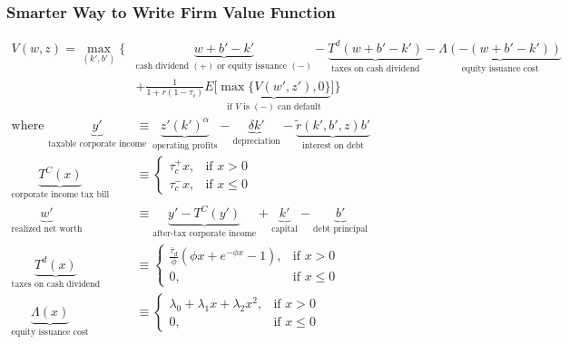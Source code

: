 \documentclass[usenames,dvipsnames, handout]{beamer}
\begin{document}
\begin{frame}
\frametitle{Smarter Way to Write Firm Value Function}
\scriptsize
\begin{align*}
V(w, z) =
\max_{(k', b')} \Bigg\{ 
& \underbrace{w + b' - k'}_{\text{cash dividend } (+) \text{ or equity issuance } (-)} - \underbrace{T^d(w + b' - k')}_{\text{taxes on cash dividend}} - \underbrace{\Lambda(-(w + b' - k'))}_{\text{equity issuance cost}} \\
&+ \frac{1}{1+r(1-\tau_i)} E\Big[\underbrace{\max\{ V(w', z'), 0\}}_{\text{if }V \text{ is } (-) \text{ can default}}\Big] \Bigg\} \\
\text{where }
\underbrace{y'}_{\text{taxable corporate income}} &\equiv \underbrace{z' (k')^\alpha}_{\text{operating profits}} - \underbrace{\delta k'}_{\text{depreciation}} - \underbrace{\tilde r(k', b', z) b'}_{\text{interest on debt}} \\
\underbrace{T^C(x)}_{\text{corporate income tax bill}} &\equiv 
\begin{cases} 
\tau_c^+ x, & \text{if }x > 0 \\
\tau_c^- x, & \text{if }x \le 0
\end{cases}\\
\underbrace{w'}_{\text{realized net worth}} &\equiv \underbrace{y' - T^C(y')}_{\text{after-tax corporate income}}+ \underbrace{k'}_{\text{capital}}  - \underbrace{b'}_{\text{debt principal}} \\
\underbrace{T^d(x)}_{\text{taxes on cash dividend}} &\equiv 
\begin{cases}
\frac{\bar \tau_d}{\phi}(\phi x + e^{-\phi x} - 1), & \text{if }x > 0 \\
0,& \text{if } x \le 0
\end{cases} \\
\underbrace{\Lambda(x)}_{\text{equity issuance cost}} &\equiv 
\begin{cases} 
\lambda_0 + \lambda_1 x + \lambda_2 x^2, & \text{if }x > 0 \\
0, & \text{if }x \le 0
\end{cases}
\end{align*}
\end{frame}
\end{document}
